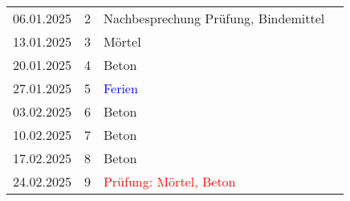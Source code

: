 \documentclass[
11pt,
captions=tableheading,
headings=big,
headsepline,
footsepline, 
captions=tableheading,
parskip=half-,
]{scrartcl}
\newcommand{\red}[1]{\textcolor{red}{#1}}
\begin{document}
\begin{table}[H]
\begin{tabular}{llp{8cm}p{4cm}}
        06.01.2025     & 2           & Nachbesprechung Prüfung, Bindemittel                     & {}                  \\
        13.01.2025     & 3           & Mörtel                                                   & {}                  \\
        20.01.2025     & 4           & Beton                                                    & {}                  \\
        \midrule
        27.01.2025     & 5           & \textcolor{blue}{Ferien}                                 & {}                  \\
        \midrule
        03.02.2025     & 6           & Beton                                                    & {}                  \\
        10.02.2025     & 7           & Beton                                                    & {}                  \\
        17.02.2025     & 8           & Beton                                                    & {}                  \\
        24.02.2025     & 9           & \red{Prüfung: Mörtel, Beton}                             &                     \\
        \bottomrule
    \end{tabular}
\end{table}
\end{document}
